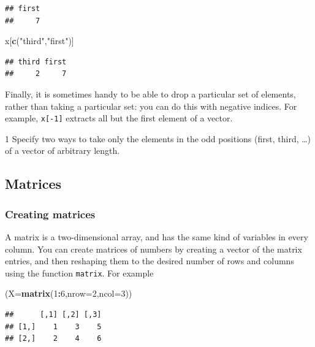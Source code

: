 \documentclass[11pt,]{article}
\newenvironment{Shaded}{\begin{snugshade}}{\end{snugshade}}
\newcommand{\DataTypeTok}[1]{\textcolor[rgb]{0.13,0.29,0.53}{#1}}
\newcommand{\DecValTok}[1]{\textcolor[rgb]{0.00,0.00,0.81}{#1}}
\newcommand{\KeywordTok}[1]{\textcolor[rgb]{0.13,0.29,0.53}{\textbf{#1}}}
\newcommand{\NormalTok}[1]{#1}
\newcommand{\OperatorTok}[1]{\textcolor[rgb]{0.81,0.36,0.00}{\textbf{#1}}}
\newcommand{\StringTok}[1]{\textcolor[rgb]{0.31,0.60,0.02}{#1}}
\let\BeginKnitrBlock\begin \let\EndKnitrBlock\end
\begin{document}
\begin{verbatim}
## first 
##     7
\end{verbatim}

\begin{Shaded}
\begin{Highlighting}[]
\NormalTok{x[}\KeywordTok{c}\NormalTok{(}\StringTok{"third"}\NormalTok{,}\StringTok{"first"}\NormalTok{)]}
\end{Highlighting}
\end{Shaded}

\begin{verbatim}
## third first 
##     2     7
\end{verbatim}

Finally, it is sometimes handy to be able to drop a particular set of elements, rather than taking a particular set: you can do this with negative indices. For example, \texttt{x{[}-1{]}} extracts all but the first
element of a vector.

\BeginKnitrBlock{exercisebox}{1}
Specify two ways to take only the elements in the odd positions (first, third, \ldots{}) of a vector of arbitrary length.
\EndKnitrBlock{exercisebox}

\hypertarget{matrices}{%
\subsection{Matrices}\label{matrices}}

\hypertarget{creating-matrices}{%
\subsubsection{Creating matrices}\label{creating-matrices}}

A matrix is a two-dimensional array, and has the same kind of variables in every column. You can create matrices of numbers by creating a vector of the matrix entries, and then reshaping them to the desired number of rows and columns using the function \texttt{matrix}. For example

\begin{Shaded}
\begin{Highlighting}[]
\NormalTok{(}\DataTypeTok{X=}\KeywordTok{matrix}\NormalTok{(}\DecValTok{1}\OperatorTok{:}\DecValTok{6}\NormalTok{,}\DataTypeTok{nrow=}\DecValTok{2}\NormalTok{,}\DataTypeTok{ncol=}\DecValTok{3}\NormalTok{))}
\end{Highlighting}
\end{Shaded}

\begin{verbatim}
##      [,1] [,2] [,3]
## [1,]    1    3    5
## [2,]    2    4    6
\end{verbatim}
\end{document}

